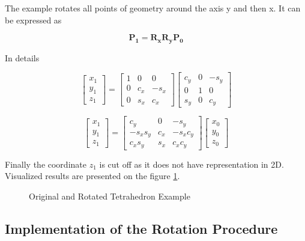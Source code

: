 The example rotates all points of geometry around the axis y and then x. It can be expressed as

\begin{equation}
\mathbf{P_1} = \mathbf{R_x R_y P_0}
\end{equation}

In details

\begin{equation}
\begin{bmatrix}
	x_1 \\
	y_1 \\
	z_1
\end{bmatrix}
=
\begin{bmatrix}
	1 & 0 & 0 \\
	0 & c_x & -s_x \\
	0 & s_x & c_x
\end{bmatrix}
\begin{bmatrix}
	c_y & 0 & -s_y \\
	0 & 1 & 0 \\
	s_y & 0 & c_y
\end{bmatrix}
\end{equation}

\begin{equation}
\begin{bmatrix}
	x_1 \\
	y_1 \\
	z_1
\end{bmatrix}
=
\begin{bmatrix}
	c_y & 0 & -s_y \\
	-s_xs_y & c_x & -s_xc_y \\
	c_xs_y & s_x & c_xc_y
\end{bmatrix}
\begin{bmatrix}
	x_0 \\
	y_0 \\
	z_0
\end{bmatrix}
\end{equation}

Finally the coordinate $z_1$ is cut off as it does not have representation in 2D. Visualized results are presented on the figure \ref{fig:object:rotation}.

\begin{figure}[H]
\centering

\caption{Original and Rotated Tetrahedron Example}
\label{fig:object:rotation}
\end{figure}

\subsection{Implementation of the Rotation Procedure}

